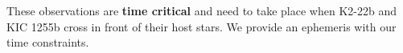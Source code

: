 \documentclass[letterpaper,12pt]{article}
\begin{document}

These observations are \textbf{time critical} and need to take place when K2-22b and KIC 1255b cross in front of their host stars.
We provide an ephemeris with our time constraints.

%
%
%
%
%
\end{document}
